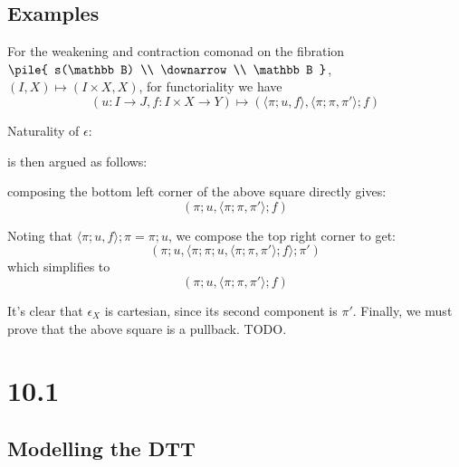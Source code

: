 \documentclass{article}
\newcommand{\vrt}[2]{
\pile{
#1 \\
\downarrow \\
#2
}
}
\begin{document}
\subsection*{Examples}

For the weakening and contraction comonad on the fibration $\vrt{s(\mathbb B)}{\mathbb B}$,
$(I,X) \mapsto (I \times X, X)$, for functoriality we have 
$$(u : I \to J, f : I \times X \to Y) \mapsto (\langle \pi;u,f \rangle, \langle\pi;\pi,\pi' \rangle;f)$$

Naturality of $\epsilon$:

\begin{center}
\end{center}

is then argued as follows:

composing the bottom left corner of the above square directly gives: $$(\pi;u,\langle \pi;\pi, \pi' \rangle;f)$$

Noting that $\langle \pi;u,f \rangle ; \pi = \pi;u$, we compose the top right corner to get:
$$(\pi;u, \langle \pi;\pi;u, \langle \pi;\pi,\pi' \rangle;f \rangle;\pi')$$
which simplifies to 
$$(\pi;u,\langle \pi;\pi, \pi' \rangle;f)$$

It's clear that $\epsilon_X$ is cartesian, since its second component is $\pi'$. Finally, we must prove that the above square is a pullback. TODO.

\section*{10.1}

\subsection*{Modelling the DTT}
\end{document}
